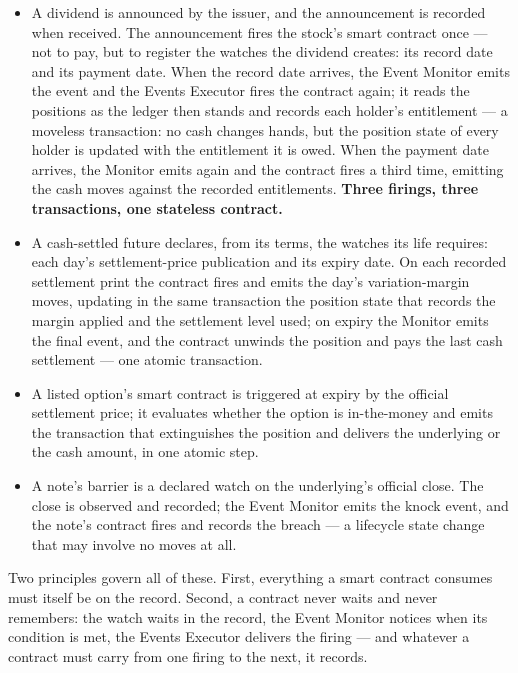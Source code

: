\documentclass[11pt,a4paper]{article}
\newcommand{\clabel}[1]{\leavevmode\hypertarget{clause-#1}{}%
  \marginpar{\raggedright\scriptsize\ttfamily\textcolor{gray}{#1}}}
\begin{document}
\begin{itemize}
\item
  A dividend is announced by the issuer, and the announcement is
  recorded when received. The announcement fires the stock's smart
  contract once --- not to pay, but to register the watches the dividend
  creates: its record date and its payment date. When the record date
  arrives, the Event Monitor emits the event and the Events Executor
  fires the contract again; it reads the positions as the ledger then
  stands and records each holder's entitlement --- a moveless
  transaction: no cash changes hands, but the position state of every
  holder is updated with the entitlement it is owed. When the payment
  date arrives, the Monitor emits again and the contract fires a third
  time, emitting the cash moves against the recorded entitlements.
  \textbf{Three firings, three transactions, one stateless contract.}
\item
  A cash-settled future declares, from its terms, the watches its life
  requires: each day's settlement-price publication and its expiry date.
  On each recorded settlement print the contract fires and emits the
  day's variation-margin moves, updating in the same transaction the
  position state that records the margin applied and the settlement
  level used; on expiry the Monitor emits the final event, and the
  contract unwinds the position and pays the last cash settlement ---
  one atomic transaction.
\item
  A listed option's smart contract is triggered at expiry by the
  official settlement price; it evaluates whether the option is
  in-the-money and emits the transaction that extinguishes the position
  and delivers the underlying or the cash amount, in one atomic step.
\item
  A note's barrier is a declared watch on the underlying's official
  close. The close is observed and recorded; the Event Monitor emits the
  knock event, and the note's contract fires and records the breach ---
  a lifecycle state change that may involve no moves at all.
\end{itemize}

Two principles govern all of these. First, \clabel{C-6.2}everything a smart contract
consumes must itself be on the record. Second, \clabel{C-6.3}a contract never waits
and never remembers: the watch waits in the record, the Event Monitor
notices when its condition is met, the Events Executor delivers the
firing --- and whatever a contract must carry from one firing to the
next, it records.
\end{document}
